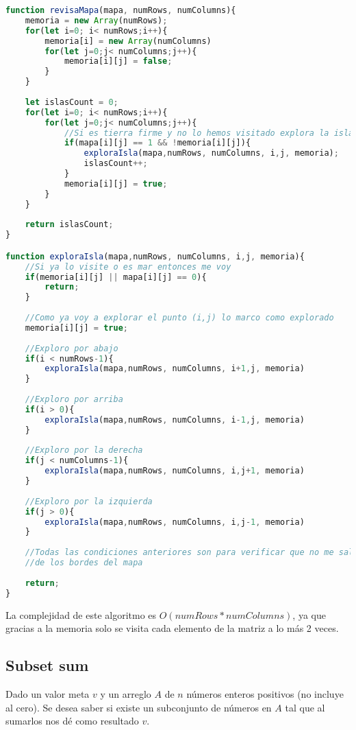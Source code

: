 \begin{lstlisting}[language=JavaScript, caption=Contar islas]
function revisaMapa(mapa, numRows, numColumns){
    memoria = new Array(numRows);
    for(let i=0; i< numRows;i++){
        memoria[i] = new Array(numColumns)
        for(let j=0;j< numColumns;j++){
            memoria[i][j] = false;
        }     
    }
    
    let islasCount = 0;
    for(let i=0; i< numRows;i++){
        for(let j=0;j< numColumns;j++){
            //Si es tierra firme y no lo hemos visitado explora la isla
            if(mapa[i][j] == 1 && !memoria[i][j]){
                exploraIsla(mapa,numRows, numColumns, i,j, memoria);
                islasCount++;
            }
            memoria[i][j] = true;
        }        
    }
    
    return islasCount;
}

function exploraIsla(mapa,numRows, numColumns, i,j, memoria){
    //Si ya lo visite o es mar entonces me voy
    if(memoria[i][j] || mapa[i][j] == 0){
        return;
    }
    
    //Como ya voy a explorar el punto (i,j) lo marco como explorado
    memoria[i][j] = true;
    
    //Exploro por abajo
    if(i < numRows-1){
        exploraIsla(mapa,numRows, numColumns, i+1,j, memoria)
    }
    
    //Exploro por arriba
    if(i > 0){
        exploraIsla(mapa,numRows, numColumns, i-1,j, memoria)
    }
    
    //Exploro por la derecha 
    if(j < numColumns-1){
        exploraIsla(mapa,numRows, numColumns, i,j+1, memoria)
    }
    
    //Exploro por la izquierda
    if(j > 0){
        exploraIsla(mapa,numRows, numColumns, i,j-1, memoria)
    }
    
    //Todas las condiciones anteriores son para verificar que no me salga
    //de los bordes del mapa
    
    return;
}
\end{lstlisting}

 La complejidad de este algoritmo es $O(numRows * numColumns)$, ya que gracias a la memoria solo se visita cada elemento de la matriz a lo más 2 veces. 
 
  
 \subsection{Subset sum}

Dado un valor meta $v$ y un arreglo $A$ de $n$ números enteros positivos (no incluye al cero). Se desea saber si existe un subconjunto de números en $A$ tal que al sumarlos nos dé como resultado $v$.


